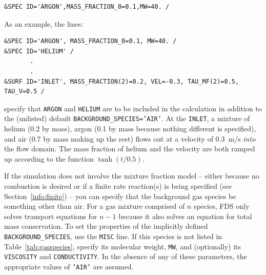 \documentclass[11pt]{book}
\newcommand{\ct}{\tt\small}
\begin{document}
\footnotesize
\begin{verbatim}
&SPEC ID='ARGON',MASS_FRACTION_0=0.1,MW=40. /
\end{verbatim}
\normalsize

\noindent
As an example, the lines:

\footnotesize
\begin{verbatim}
&SPEC ID='ARGON', MASS_FRACTION_0=0.1, MW=40. /
&SPEC ID='HELIUM' /
       .
       .
&SURF ID='INLET', MASS_FRACTION(2)=0.2, VEL=-0.3, TAU_MF(2)=0.5, TAU_V=0.5 /
\end{verbatim}
\normalsize

\noindent
specify that {\ct ARGON} and {\ct HELIUM} are to be included in the calculation
in addition to the (unlisted) default
{\ct BACKGROUND\_SPECIES='AIR'}. At
the {\ct INLET}, a mixture of helium (0.2 by mass), argon (0.1 by mass
because nothing different is specified), and air (0.7 by mass making
up the rest) flows out at a velocity of 0.3~m/s {\em into} the flow
domain. The mass fraction of helium and the velocity are both
ramped up according to the function $\tanh(t/0.5)$.

If the simulation does not involve the mixture fraction model -- either because no combustion is
desired or if a finite rate reaction(s) is being specified (see Section~\ref{info:finite}) -- you can
specify that the background gas species be something other than air. For a gas mixture comprised of
$n$ species, FDS only solves transport equations for $n-1$ because it also solves an equation for
total mass conservation. To set the properties of the implicitly defined {\ct BACKGROUND\_SPECIES}, use the
{\ct MISC} line. If this species is not listed in Table~\ref{tab:gasspecies}, specify its molecular weight, {\ct MW},
and (optionally) its {\ct VISCOSITY} and {\ct CONDUCTIVITY}. In the absence of any of these parameters, the appropriate
values of {\ct 'AIR'} are assumed.
\end{document}

